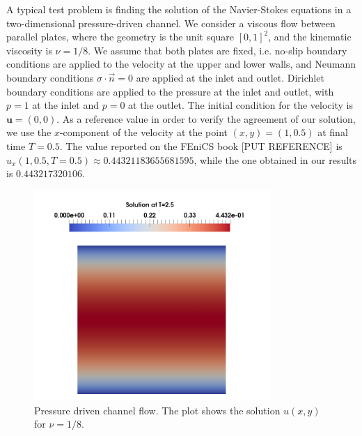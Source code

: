 \documentclass[a4paper,11pt,openright,twoside]{book}
\begin{document}

A typical test problem is finding the solution of the Navier-Stokes equations in a two-dimensional pressure-driven channel. We consider a viscous flow between parallel plates, where the geometry is the unit square $[0,1]^2$, and the kinematic viscosity is $\nu = 1/8$. We assume that both plates are fixed, i.e. no-slip boundary conditions are applied to the velocity at the upper and lower walls, and Neumann boundary conditions $\sigma \cdot \vec{n} = 0$ are applied at the inlet and outlet. Dirichlet boundary conditions are applied to the pressure at the inlet and outlet, with $p = 1$ at the inlet and $p = 0$ at the outlet. The initial condition for the velocity is $\mathbf{u} = (0,0)$. As a reference value in order to verify the agreement of our solution, we use the $x$-component of the velocity at the point $(x, y) = (1, 0.5)$ at final time $T = 0.5 $. The value reported on the FEniCS book [PUT REFERENCE] is $u_x(1, 0.5, T=0.5) \approx 0.44321183655681595$, while the one obtained in our results is $0.443217320106$.

\begin{figure}[h!]
\centering
\includegraphics[width=0.8\textwidth]{images/velocity_solution.png}
\caption{Pressure driven channel flow. The plot shows the solution $u(x,y)$ for $\nu = 1/8$.}
\end{figure}
\end{document}
